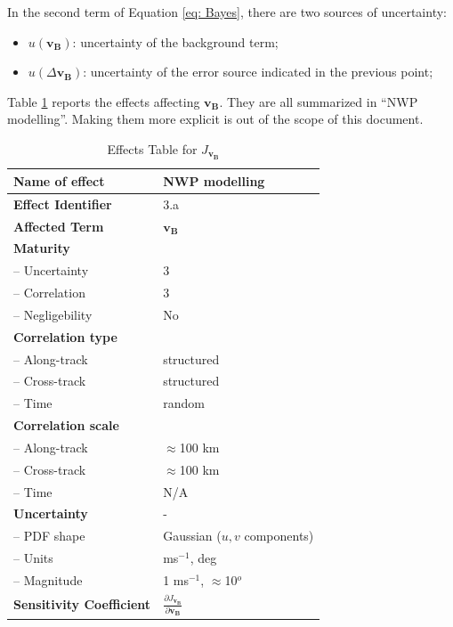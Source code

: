 In the second term of Equation \ref{eq: Bayes}, there are two sources of uncertainty:
\begin{itemize}
	\item $u(\mathbf{v_{B}})$: uncertainty of the background term;
	\item $u(\Delta \mathbf{v_{B}})$: uncertainty of the error source indicated in the previous point;
\end{itemize}

Table \ref{tab: effects JvB} reports the effects affecting $\mathbf{v_{B}}$. They are all summarized in ``\ac{NWP} modelling''. Making them more explicit is out of the scope of this document.

\begin{table}[h]
	\centering
	\scriptsize %
	\setlength{\tabcolsep}{2pt} %
	\caption{Effects Table for $J_{\mathbf{v_{B}}}$}
	
	\begin{tabularx}{\textwidth}{l | X}
		\toprule
		\textbf{Name of effect} & NWP modelling \\
		\midrule
		\textbf{Effect Identifier} & 3.a \\
		\midrule
		\textbf{Affected Term} & $\mathbf{v_{B}}$ \\
		\midrule
		\textbf{Maturity} & \\
		\quad -- Uncertainty & 3 \\
		\quad -- Correlation & 3 \\
		\quad -- Negligebility & No \\
		\midrule
		\textbf{Correlation type} & \\
		\quad -- Along-track & structured \\
		\quad -- Cross-track & structured \\
		\quad -- Time & random \\
		\midrule
		\textbf{Correlation scale} & \\
		\quad -- Along-track & $\approx$100 km \\
		\quad -- Cross-track & $\approx$100 km \\
		\quad -- Time & N/A \\
		\midrule
		\textbf{Uncertainty} & - \\
		\quad -- PDF shape & Gaussian ($u,v$ components) \\
		\quad -- Units & ms$^{-1}$, deg \\
		\quad -- Magnitude & 1 ms$^{-1}$, $\approx$10$^{o}$ \\
		\midrule
		\textbf{Sensitivity Coefficient} & $\frac{\partial J_{\mathbf{v_{B}}}}{\partial \mathbf{v_{B}}}$ \\
		\bottomrule
	\end{tabularx}
	\label{tab: effects JvB}
\end{table}

